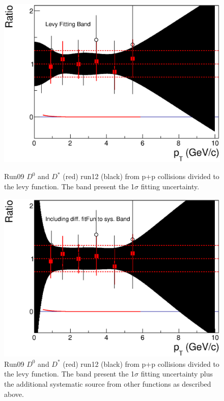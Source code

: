 \begin{figure}[htbp]
\begin{minipage}[htbp]{0.47\linewidth}
\centering
\includegraphics[width=1.0\textwidth,angle=0]{figure/Run14_D0HFT/pp_baseLine_Ratio.eps}
\caption{Run09 $D^{0}$ and $D^*$ (red) run12 (black) from p+p collisions divided to the levy function. The band present the 1$\sigma$ fitting uncertainty. \label{pp_baseLine_ratio}}
\end{minipage}
\hfill
\begin{minipage}[htbp]{0.47\linewidth}
\centering
\includegraphics[width=1.0\textwidth,angle=0]{figure/Run14_D0HFT/pp_baseLine_Ratio3.eps}
\caption{Run09 $D^{0}$ and $D^*$ (red) run12 (black) from p+p collisions divided to the levy function. The band present the 1$\sigma$ fitting uncertainty plus the additional systematic source from other functions as described above. \label{pp_baseLine_ratio_3}}
\end{minipage}
\end{figure}

